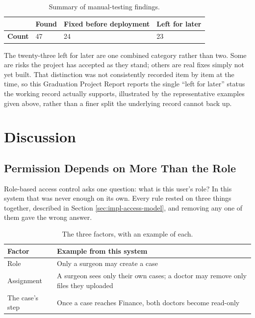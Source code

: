 \begin{table}[H]
\centering
\caption{Summary of manual-testing findings.}
\label{tab:manual-testing-summary}
\begin{tabular}{|p{4cm}|p{2.5cm}|p{4.5cm}|p{2.5cm}|}
\hline
 & \textbf{Found} & \textbf{Fixed before deployment} & \textbf{Left for later} \\
\hline
\textbf{Count} & 47 & 24 & 23 \\
\hline
\end{tabular}
\end{table}

The twenty-three left for later are one combined category rather than two. Some are risks the project has accepted as they stand; others are real fixes simply not yet built. That distinction was not consistently recorded item by item at the time, so this Graduation Project Report reports the single ``left for later'' status the working record actually supports, illustrated by the representative examples given above, rather than a finer split the underlying record cannot back up.

\section{Discussion}
\label{sec:result-discussion}

\subsection{Permission Depends on More Than the Role}

Role-based access control asks one question: what is this user's role? In this system that was never enough on its own. Every rule rested on three things together, described in Section \ref{sec:impl-access-model}, and removing any one of them gave the wrong answer.

\begin{table}[H]
\centering
\caption{The three factors, with an example of each.}
\label{tab:three-factors-table}
\begin{tabular}{|p{3cm}|p{10.9cm}|}
\hline
\textbf{Factor} & \textbf{Example from this system} \\
\hline
Role & Only a surgeon may create a case \\
\hline
Assignment & A surgeon sees only their own cases; a doctor may remove only files they uploaded \\
\hline
The case's step & Once a case reaches Finance, both doctors become read-only \\
\hline
\end{tabular}
\end{table}

